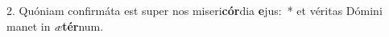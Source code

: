 2. Quóniam confirmáta est super nos miseri\textbf{cór}dia \textbf{e}jus:~*  et véritas Dómini manet in \textit{æ}\textbf{tér}num.\


